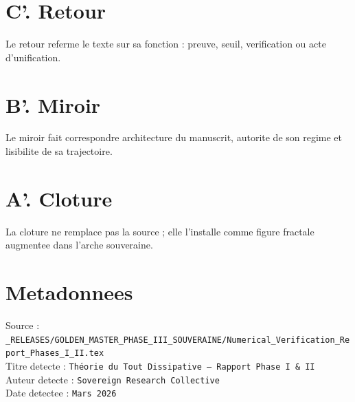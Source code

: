\documentclass[11pt,a4paper]{article}
\begin{document}
\section*{C'. Retour}
Le retour referme le texte sur sa fonction : preuve, seuil, verification ou acte d'unification.

\section*{B'. Miroir}
Le miroir fait correspondre architecture du manuscrit, autorite de son regime et lisibilite de sa trajectoire.

\section*{A'. Cloture}
La cloture ne remplace pas la source ; elle l'installe comme figure fractale augmentee dans l'arche souveraine.

\section*{Metadonnees}
Source : \texttt{_RELEASES/GOLDEN_MASTER_PHASE_III_SOUVERAINE/Numerical_Verification_Report_Phases_I_II.tex}\\
Titre detecte : \texttt{Théorie du Tout Dissipative -- Rapport Phase I \& II}\\
Auteur detecte : \texttt{Sovereign Research Collective}\\
Date detectee : \texttt{Mars 2026}
\end{document}
